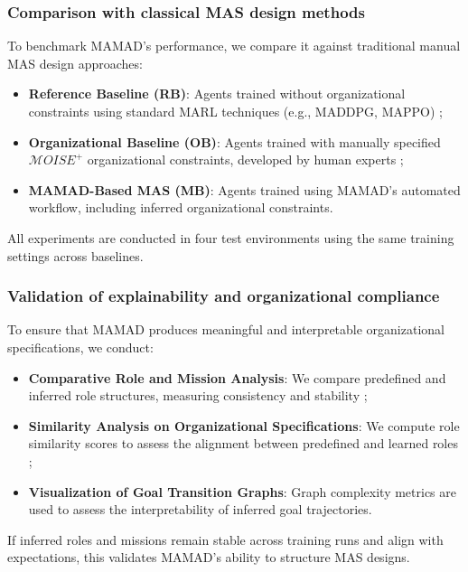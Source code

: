 \documentclass[journal]{IEEEtai}
\begin{document}
\subsubsection{Comparison with classical MAS design methods}
To benchmark MAMAD's performance, we compare it against traditional manual MAS design approaches:
\begin{itemize}
    \item \textbf{Reference Baseline (RB)}: Agents trained without organizational constraints using standard MARL techniques (e.g., MADDPG, MAPPO) ;
    \item \textbf{Organizational Baseline (OB)}: Agents trained with manually specified $\mathcal{M}OISE^+$ organizational constraints, developed by human experts ;
    \item \textbf{MAMAD-Based MAS (MB)}: Agents trained using MAMAD's automated workflow, including inferred organizational constraints.
\end{itemize}

All experiments are conducted in four test environments using the same training settings across baselines.

\subsubsection{Validation of explainability and organizational compliance}
To ensure that MAMAD produces meaningful and interpretable organizational specifications, we conduct:
\begin{itemize}
    \item \textbf{Comparative Role and Mission Analysis}: We compare predefined and inferred role structures, measuring consistency and stability ;
    \item \textbf{Similarity Analysis on Organizational Specifications}: We compute role similarity scores to assess the alignment between predefined and learned roles ;
    \item \textbf{Visualization of Goal Transition Graphs}: Graph complexity metrics are used to assess the interpretability of inferred goal trajectories.
\end{itemize}

If inferred roles and missions remain stable across training runs and align with expectations, this validates MAMAD's ability to structure MAS designs.
\end{document}
